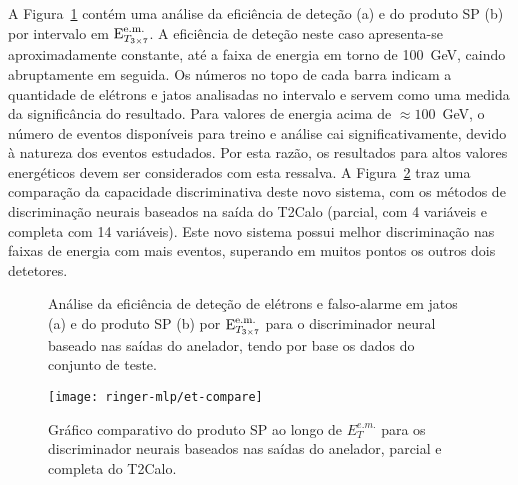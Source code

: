 A Figura~\ref{fig:ringer-efficiency-et} contém uma análise da eficiência de
deteção (a) e do produto SP (b) por intervalo em $\text{E}^{\text{e.m.}}_{T_{3\times7}}$. A eficiência de
deteção neste caso apresenta-se aproximadamente constante, até a faixa de
energia em torno de 100~GeV, caindo abruptamente em seguida. Os números no
topo de cada barra indicam a quantidade de elétrons e jatos analisadas no
intervalo e servem como uma medida da significância do resultado. Para valores
de energia acima de $\approx 100$~GeV, o número de eventos disponíveis para
treino e análise cai significativamente, devido à natureza dos eventos
estudados. Por esta razão, os resultados para altos valores energéticos devem
ser considerados com esta ressalva. A Figura~\ref{fig:ringer-et-compare} traz
uma comparação da capacidade discriminativa deste novo sistema, com os métodos
de discriminação neurais baseados na saída do T2Calo (parcial, com 4 variáveis
e completa com 14 variáveis). Este novo sistema possui melhor discriminação
nas faixas de energia com mais eventos, superando em muitos pontos os outros
dois detetores.

\begin{figure}
\begin{center}
\end{center}
\caption{Análise da eficiência de deteção de elétrons e falso-alarme em jatos
(a) e do produto SP (b) por $\text{E}^{\text{e.m.}}_{T_{3\times7}}$ para o discriminador neural baseado nas
saídas do anelador, tendo por base os dados do conjunto de teste.}
\label{fig:ringer-efficiency-et}
\end{figure}

\begin{figure}
\begin{center}
\texttt{[image: ringer-mlp/et-compare]}
\end{center}
\caption{Gráfico comparativo do produto SP ao longo de $E^{e.m.}_T$ para os
discriminador neurais baseados nas saídas do anelador, parcial e completa do
T2Calo.}
\label{fig:ringer-et-compare}
\end{figure}

